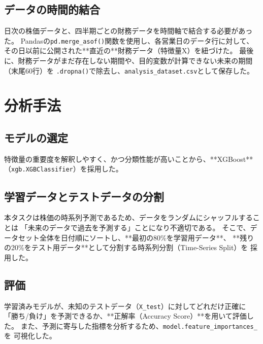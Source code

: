 \documentclass[a4paper, 11pt]{ltjsarticle}
\begin{document}
\subsection*{データの時間的結合}
日次の株価データと、四半期ごとの財務データを時間軸で結合する必要があった。
Pandasの\texttt{pd.merge\_asof()}関数を使用し、各営業日のデータ行に対して、
その日以前に公開された**直近の**財務データ（特徴量X）を紐づけた。
最後に、財務データがまだ存在しない期間や、目的変数が計算できない未来の期間（末尾60行）を
\texttt{.dropna()}で除去し、\texttt{analysis\_dataset.csv}として保存した。

\section{分析手法}
\subsection*{モデルの選定}
特徴量の重要度を解釈しやすく、かつ分類性能が高いことから、**XGBoost**
（\texttt{xgb.XGBClassifier}）を採用した。

\subsection*{学習データとテストデータの分割}
本タスクは株価の時系列予測であるため、データをランダムにシャッフルすることは
「未来のデータで過去を予測する」ことになり不適切である。
そこで、データセット全体を日付順にソートし、**最初の80\%を学習用データ**、
**残りの20\%をテスト用データ**として分割する時系列分割（Time-Series Split）を
採用した。

\subsection*{評価}
学習済みモデルが、未知のテストデータ（\texttt{X\_test}）に対してどれだけ正確に
「勝ち/負け」を予測できるか、**正解率（Accuracy Score）**を用いて評価した。
また、予測に寄与した指標を分析するため、\texttt{model.feature\_importances\_}を
可視化した。
\end{document}

